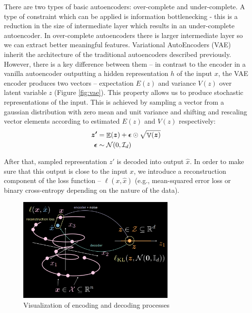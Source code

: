 There are two types of basic autoencoders: over-complete and under-complete. A type of constraint which can be applied is information bottlenecking - this is a reduction in the size of intermediate layer which results in an under-complete autoencoder. In over-complete autoencoders there is larger intermediate layer so we can extract better meaningful features. Variational AutoEncoders (VAE) inherit the architecture of the traditional autoencoders described previously. However, there is a key difference between them -- in contrast to the encoder in a vanilla autoencoder outputting a hidden representation $h$ of the input $x$, the VAE encoder produces two vectors -- expectation $E(z)$ and variance $V(z)$ over latent variable $z$ (Figure \ref{fig:vae}). This property allows us to produce stochastic representations of the input. This is achieved by sampling a vector from a gaussian distribution with zero mean and unit variance and shifting and rescaling vector elements according to estimated $E(z)$ and $V(z)$ respectively:
\begin{align*}
    \vect{z'} &= \mathop{\mathbb{E}}(\vect{z}) + \vect{\epsilon} \odot \sqrt{\mathop{\mathbb{V}}(\vect{z})} \\
    \vect{\epsilon} &\sim \mathcal{N}(0, \mathcal{I}_d)
\end{align*}

After that, sampled representation $z'$ is decoded into output $\hat{x}$. In order to make sure that this output is close to the input $x$, we introduce a reconstruction component of the loss function -- $\ell(x,\hat{x})$ (e.g., mean-squared error loss or binary cross-entropy depending on the nature of the data).

\begin{figure}[H]
    \centering
    \includegraphics[width=0.7\textwidth]{figs/vae_expl.png}
    \caption{Visualization of encoding and decoding processes}
    \label{fig:vae_expl}
\end{figure}

